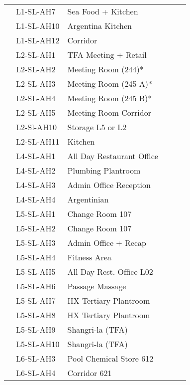 \begin{table}[htbp]
\begin{tabular}{llp{3.2cm} c c l}
\inc	 	 &L1-SL-AH7	 &Sea Food + Kitchen	 	&&  &\\
 
\inc	 	 &L1-SL-AH10	 &Argentina Kitchen	 	& & &\\
 
\inc	 	 &L1-SL-AH12	 &Corridor	 	 	&  & &\\
\midrule

\inc	 	 &L2-SL-AH1	 &TFA Meeting + Retail	& && \\
\inc	 	 &L2-SL-AH2	 &Meeting Room (244)*	& 	 && \\
\inc	 	 &L2-SL-AH3	 &Meeting Room (245 A)*	 &&	 & \\
\inc	 	 &L2-SL-AH4	 &Meeting Room (245 B)*	 & && \\
\inc	 	 &L2-SL-AH5	 &Meeting Room Corridor	 &  && \\

\inc	 	 &L2-Sl-AH10	 &Storage L5 or L2	 	& & &\\
\inc  	 &L2-SL-AH11	 &Kitchen	 	 	&  && \\
\midrule 

\inc  	 &L4-SL-AH1	 &All Day Restaurant Office	& &    &\\
\inc	 	 &L4-SL-AH2	 &Plumbing Plantroom	 	&  & &\\
\inc	 	 &L4-SL-AH3	 &Admin Office Reception	 &  &&\\
\inc	 	 &L4-SL-AH4	 &Argentinian	 	 	 & & &\\
\midrule 

\inc 	 &L5-SL-AH1	 &Change Room 107	 	 & & &\\
\inc	 	 &L5-SL-AH2	 &Change Room 107	 	 &	& & \\
\inc	 	 &L5-SL-AH3	 &Admin Office + Recap	 &	 &&\\
\inc	 	 &L5-SL-AH4	 &Fitness Area	  		 &	 &&\\
\inc	 	 &L5-SL-AH5	 &All Day Rest. Office L02	& &	 &\\
\inc	 	 &L5-SL-AH6	 &Passage Massage	 	 &	 & &\\
\inc	 	 &L5-SL-AH7	 &HX Tertiary Plantroom	 &	 &&\\
\inc	 	 &L5-SL-AH8	 &HX Tertiary Plantroom	 &	 & &\\
\inc	 	 &L5-SL-AH9	 &Shangri-la (TFA)	 	 &	 & &\\
\inc	 	 &L5-SL-AH10	 &Shangri-la (TFA)	 	 &	 & &\\


 
\midrule
\inc	 	 &L6-SL-AH3	 &Pool Chemical Store 612	 &  && \\
\inc	 	 &L6-SL-AH4	 &Corridor 621	 	 	 & & &\\
\midrule




\end{tabular}
\end{table}

